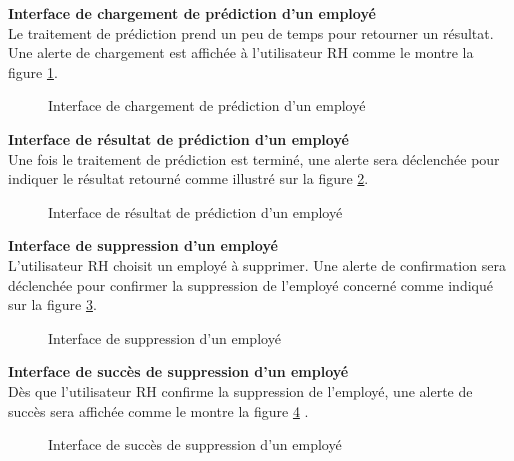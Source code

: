 \newpage

\textbf{Interface de chargement de prédiction d'un employé}\\
Le traitement de prédiction prend un peu de temps pour retourner un résultat. Une alerte de chargement est affichée à l'utilisateur RH comme le montre la figure \ref{fig:realisationPFe_sprint2_prediction}.
    \begin{figure}[htpb]
    \centering
    \caption{Interface de chargement de prédiction d'un employé}
    \label{fig:realisationPFe_sprint2_prediction}
    \end{figure}
    
\textbf{Interface de résultat de prédiction d'un employé}\\
Une fois le traitement de prédiction est terminé, une alerte sera déclenchée pour indiquer le résultat retourné comme illustré sur la figure     \ref{fig:realisationPFe_sprint2_prediction_result}.
    \begin{figure}[htpb]
    \centering
    \caption{Interface de résultat de prédiction d'un employé}
    \label{fig:realisationPFe_sprint2_prediction_result}
    \end{figure}

\newpage
\textbf{Interface de suppression d'un employé}\\
L'utilisateur RH choisit un employé à supprimer. Une alerte de confirmation sera déclenchée pour confirmer la suppression de l'employé concerné comme indiqué sur la figure \ref{fig:realisationPFe_sprint2_suppression}.
    \begin{figure}[htpb]
    \centering
    \caption{Interface de suppression d'un employé}
    \label{fig:realisationPFe_sprint2_suppression}
    \end{figure}


\textbf{Interface de succès de suppression d'un employé}\\
Dès que l'utilisateur RH confirme la suppression de l'employé, une alerte de succès sera affichée comme le montre la figure \ref{fig:realisationPFe_sprint2_suppression2} .
    \begin{figure}[htpb]
    \centering
    \caption{Interface de succès de suppression d'un employé}
    \label{fig:realisationPFe_sprint2_suppression2}
    \end{figure}
\newpage

